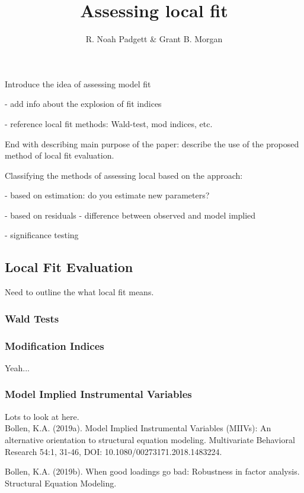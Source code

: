 \documentclass[man, noextraspace, floatsintext, 12pt]{apa7}
\title{Assessing local fit}
\author{R. Noah Padgett \& Grant B. Morgan}
\affiliation{Baylor University}
\begin{document}
\maketitle

\setlength{\abovedisplayskip}{3pt}
\setlength{\belowdisplayskip}{3pt}

Introduce the idea of assessing model fit

- add info about the explosion of fit indices

- reference local fit methods: Wald-test, mod indices, etc.


End with describing main purpose of the paper: describe the use of the proposed method of local fit evaluation.



Classifying the methods of assessing local based on the approach:

- based on estimation: do you estimate new parameters?

- based on residuals - difference between observed and model implied

- significance testing


\subsection{Local Fit Evaluation}
Need to outline the what local fit means.

\subsubsection{Wald Tests}

\subsubsection{Modification Indices}
Yeah...

\subsubsection{Model Implied Instrumental Variables}

Lots to look at here.\\

Bollen, K.A. (2019a).  Model Implied Instrumental Variables (MIIVs): An alternative orientation to structural equation modeling.  Multivariate Behavioral Research 54:1, 31-46, DOI: 10.1080/00273171.2018.1483224.

Bollen, K.A. (2019b).  When good loadings go bad: Robustness in factor analysis. Structural Equation Modeling.
\end{document}

